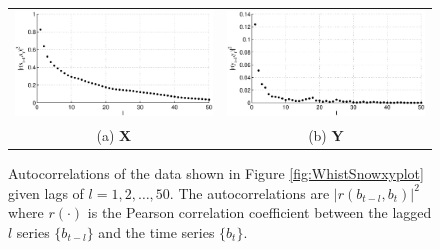 \begin{figure}[ht]
\begin{tabular}{cc}
\includegraphics[scale=0.48]{WhistlerDailyExample_autocorrX.eps} & \includegraphics[scale=0.48]{WhistlerDailyExample_autocorrY.eps} \\
(a) $\mathbf{X}$ & (b) $\mathbf{Y}$
\end{tabular}
\caption{Autocorrelations of the data shown in Figure \ref{fig:WhistSnowxyplot} given lags of $l=1,2,\ldots,50$.  The autocorrelations are $|r(b_{t-l},b_t)|^2$ where $r(\cdot)$ is the Pearson correlation coefficient between the lagged $l$ series $\{b_{t-l}\}$ and the time series $\{b_{t}\}$.}
\label{fig:WhistSnowxyautocorr}
\end{figure}

